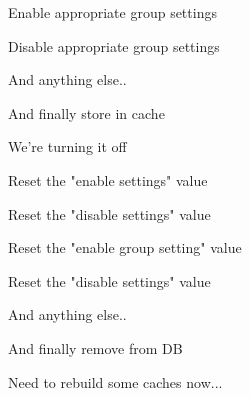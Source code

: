 \begin{DoxyVerb}                       Enable appropriate group settings\end{DoxyVerb}


\begin{DoxyVerb}                       Disable appropriate group settings\end{DoxyVerb}


\begin{DoxyVerb}                       And anything else..\end{DoxyVerb}


\begin{DoxyVerb}                       And finally store in cache\end{DoxyVerb}


\begin{DoxyVerb}               We're turning it off\end{DoxyVerb}


\begin{DoxyVerb}                       Reset the "enable settings" value\end{DoxyVerb}


\begin{DoxyVerb}                       Reset the "disable settings" value\end{DoxyVerb}


\begin{DoxyVerb}                       Reset the "enable group setting" value\end{DoxyVerb}


\begin{DoxyVerb}                       Reset the "disable settings" value\end{DoxyVerb}


\begin{DoxyVerb}                       And anything else..\end{DoxyVerb}


\begin{DoxyVerb}                       And finally remove from DB\end{DoxyVerb}


\begin{DoxyVerb}               Need to rebuild some caches now...\end{DoxyVerb}


